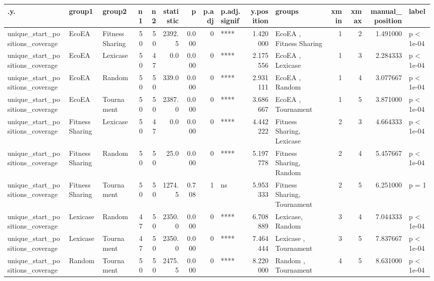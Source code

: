 \documentclass[]{book}
\begin{document}
\begin{table}
\centering
\begin{tabular}[t]{l|l|l|r|r|r|r|r|l|r|l|r|r|r|l}
\hline
.y. & group1 & group2 & n1 & n2 & statistic & p & p.adj & p.adj.signif & y.position & groups & xmin & xmax & manual\_position & label\\
\hline
unique\_start\_positions\_coverage & EcoEA & Fitness Sharing & 50 & 50 & 2392.5 & 0.000 & 0 & **** & 1.420000 & EcoEA          , Fitness Sharing & 1 & 2 & 1.491000 & p < 1e-04\\
\hline
unique\_start\_positions\_coverage & EcoEA & Lexicase & 50 & 47 & 0.0 & 0.000 & 0 & **** & 2.175556 & EcoEA   , Lexicase & 1 & 3 & 2.284333 & p < 1e-04\\
\hline
unique\_start\_positions\_coverage & EcoEA & Random & 50 & 50 & 339.0 & 0.000 & 0 & **** & 2.931111 & EcoEA , Random & 1 & 4 & 3.077667 & p < 1e-04\\
\hline
unique\_start\_positions\_coverage & EcoEA & Tournament & 50 & 50 & 2387.0 & 0.000 & 0 & **** & 3.686667 & EcoEA     , Tournament & 1 & 5 & 3.871000 & p < 1e-04\\
\hline
unique\_start\_positions\_coverage & Fitness Sharing & Lexicase & 50 & 47 & 0.0 & 0.000 & 0 & **** & 4.442222 & Fitness Sharing, Lexicase & 2 & 3 & 4.664333 & p < 1e-04\\
\hline
unique\_start\_positions\_coverage & Fitness Sharing & Random & 50 & 50 & 25.0 & 0.000 & 0 & **** & 5.197778 & Fitness Sharing, Random & 2 & 4 & 5.457667 & p < 1e-04\\
\hline
unique\_start\_positions\_coverage & Fitness Sharing & Tournament & 50 & 50 & 1274.5 & 0.708 & 1 & ns & 5.953333 & Fitness Sharing, Tournament & 2 & 5 & 6.251000 & p = 1\\
\hline
unique\_start\_positions\_coverage & Lexicase & Random & 47 & 50 & 2350.0 & 0.000 & 0 & **** & 6.708889 & Lexicase, Random & 3 & 4 & 7.044333 & p < 1e-04\\
\hline
unique\_start\_positions\_coverage & Lexicase & Tournament & 47 & 50 & 2350.0 & 0.000 & 0 & **** & 7.464444 & Lexicase  , Tournament & 3 & 5 & 7.837667 & p < 1e-04\\
\hline
unique\_start\_positions\_coverage & Random & Tournament & 50 & 50 & 2475.5 & 0.000 & 0 & **** & 8.220000 & Random    , Tournament & 4 & 5 & 8.631000 & p < 1e-04\\
\hline
\end{tabular}
\end{table}
\end{document}
